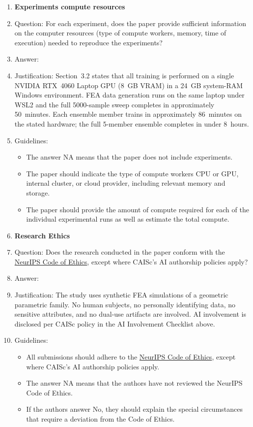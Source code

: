 \documentclass{article}
\begin{document}
\begin{enumerate}
\item {\bf Experiments compute resources}
    \item[] Question: For each experiment, does the paper provide sufficient information on the computer resources (type of compute workers, memory, time of execution) needed to reproduce the experiments?
    \item[] Answer: \answerYes{}
    \item[] Justification: Section~3.2 states that all training is performed on a single NVIDIA RTX~4060 Laptop GPU (8~GB VRAM) in a 24~GB system-RAM Windows environment. FEA data generation runs on the same laptop under WSL2 and the full 5000-sample sweep completes in approximately 50~minutes. Each ensemble member trains in approximately 86~minutes on the stated hardware; the full 5-member ensemble completes in under 8~hours.
    \item[] Guidelines:
    \begin{itemize}
        \item The answer NA means that the paper does not include experiments.
        \item The paper should indicate the type of compute workers CPU or GPU, internal cluster, or cloud provider, including relevant memory and storage.
        \item The paper should provide the amount of compute required for each of the individual experimental runs as well as estimate the total compute.
    \end{itemize}

\item {\bf Research Ethics}
    \item[] Question: Does the research conducted in the paper conform with the \href{https://neurips.cc/Conferences/2026/MainTrackHandbook}{NeurIPS Code of Ethics}, except where CAISc's AI authorship policies apply?
    \item[] Answer: \answerYes{}
    \item[] Justification: The study uses synthetic FEA simulations of a geometric parametric family. No human subjects, no personally identifying data, no sensitive attributes, and no dual-use artifacts are involved. AI involvement is disclosed per CAISc policy in the AI Involvement Checklist above.
    \item[] Guidelines:
    \begin{itemize}
        \item All submissions should adhere to the \href{https://neurips.cc/Conferences/2026/MainTrackHandbook}{NeurIPS Code of Ethics}, except where CAISc's AI authorship policies apply.
        \item The answer NA means that the authors have not reviewed the NeurIPS Code of Ethics.
        \item If the authors answer No, they should explain the special circumstances that require a deviation from the Code of Ethics.
    \end{itemize}


\end{enumerate}
\end{document}
